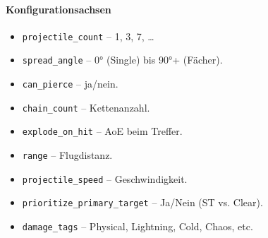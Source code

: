 \paragraph{Konfigurationsachsen}{}

\begin{itemize}
	\item \texttt{projectile\_count} – 1, 3, 7, …
	\item \texttt{spread\_angle} – 0° (Single) bis 90°+ (Fächer).
	\item \texttt{can\_pierce} – ja/nein.
	\item \texttt{chain\_count} – Kettenanzahl.
	\item \texttt{explode\_on\_hit} – AoE beim Treffer.
	\item \texttt{range} – Flugdistanz.
	\item \texttt{projectile\_speed} – Geschwindigkeit.
	\item \texttt{prioritize\_primary\_target} – Ja/Nein (ST vs. Clear).
	\item \texttt{damage\_tags} – Physical, Lightning, Cold, Chaos, etc.
\end{itemize}

